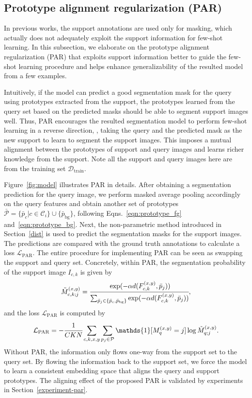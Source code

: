\documentclass[10pt,twocolumn,letterpaper]{article}
\begin{document}
\subsection{Prototype alignment regularization (PAR)} \label{sec:method-par}

In previous works, the support annotations are used only for masking, which actually does not adequately exploit the support information for few-shot learning. In this subsection, we elaborate on the prototype alignment regularization (PAR) that exploits support information better to guide the few-shot learning procedure and helps enhance generalizability of the resulted model from a few examples. 


Intuitively, if the model can predict a good segmentation mask for the query using prototypes extracted from the support, the prototypes learned from the query set based on the predicted masks should be able to segment support images well. Thus, PAR encourages the resulted segmentation model to perform few-shot learning in a reverse direction, \ie, taking the query and the predicted mask as the new support to learn to segment the support images. This imposes a mutual alignment between the prototypes of support and query images and learns richer knowledge from the support. Note all the support and query images here are from the training set $\mathcal{D}_{\text{train}}$.

Figure~\ref{fig:model} illustrates PAR in details. After obtaining a segmentation prediction for the query image, we perform masked average pooling accordingly on the query features and obtain  another set of prototypes $\bar{\mathcal{P}}=\{\bar{p}_c|c\in\mathcal{C}_i\}\cup\{\bar{p}_{\text{bg}}\}$, following Eqns.~\eqref{eqn:prototype_fg} and~\eqref{eqn:prototype_bg}. Next, the non-parametric method introduced in Section~\ref{dist} is used to predict the segmentation masks for the support images. The predictions are compared with the ground truth annotations to calculate a loss $\mathcal{L}_{\text{PAR}}$. The entire procedure for implementing  PAR can be seen as swapping the support and query set. Concretely, within PAR, the segmentation probability of the support image $I_{c,k}$ is given by
\begin{equation}
\label{eqn:prob_map_supp}
    \tilde{M}_{c,k;j}^{(x,y)} = \cfrac{\exp(-\alpha d(F_{c,k}^{(x, y)}, \bar{p}_j))}{\sum_{\bar{p}_j\in \{\bar{p}_c, \bar{p}_{\text{bg}}\}}\exp(-\alpha d(F_{c,k}^{(x, y)}, \bar{p}_j))},
\end{equation}
and the loss $\mathcal{L}_{\text{PAR}}$ is computed by
\begin{equation}
\label{eqn:loss_par}
    \mathcal{L}_{\text{PAR}} = -\cfrac{1}{CKN}\sum_{c,k,x,y} \sum_{p_j\in\mathcal{P}}\mathds{1}[M_{q}^{(x,y)}=j]\log  \tilde{M}_{q;j}^{(x,y)}.
\end{equation}
Without PAR, the information only flows one-way from the support set to the query set. By flowing the information back to the support set, we force the model to learn a consistent embedding space that aligns the query and support prototypes. The aligning effect of the proposed PAR is validated by experiments in Section~\ref{experiment-par}.
\end{document}
